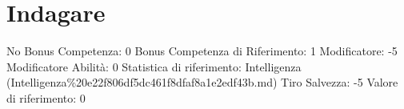 \section{Indagare}\label{indagare}

\begin{description}
\tightlist
\item[Tags: ABI]
No Bonus Competenza: 0 Bonus Competenza di Riferimento: 1 Modificatore:
-5 Modificatore Abilità: 0 Statistica di riferimento: Intelligenza
(Intelligenza\%20e22f806df5dc461f8dfaf8a1e2edf43b.md) Tiro Salvezza: -5
Valore di riferimento: 0
\end{description}
